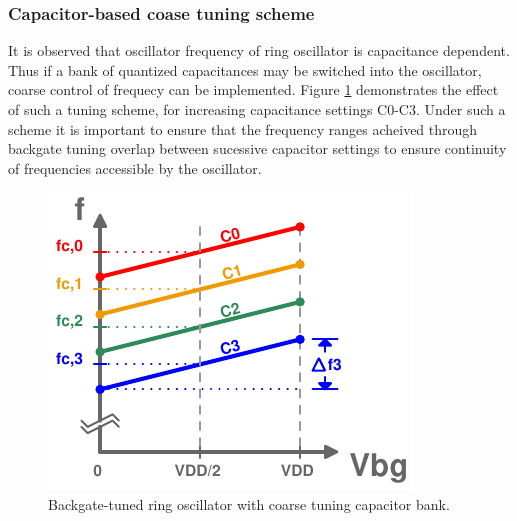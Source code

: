 		\subsubsection{Capacitor-based coase tuning scheme}
		It is observed that oscillator frequency of ring oscillator is capacitance dependent. Thus if a bank of quantized capacitances may be switched into the oscillator, coarse control of frequecy can be implemented. Figure \ref{fig:rosc_tuning} demonstrates the effect of such a tuning scheme, for increasing capacitance settings C0-C3. Under such a scheme it is important to ensure that the frequency ranges acheived through backgate tuning overlap between sucessive capacitor settings to ensure continuity of frequencies accessible by the oscillator. 
		\FloatBarrier
		\begin{figure}[htb!]
			\center\includegraphics[width=0.4\linewidth, angle=0]{figs/backgate_rosc_tuning2.pdf}
			\caption{Backgate-tuned ring oscillator with coarse tuning capacitor bank.}
			\label{fig:rosc_tuning}
		\end{figure}

		
		\FloatBarrier\pagebreak
